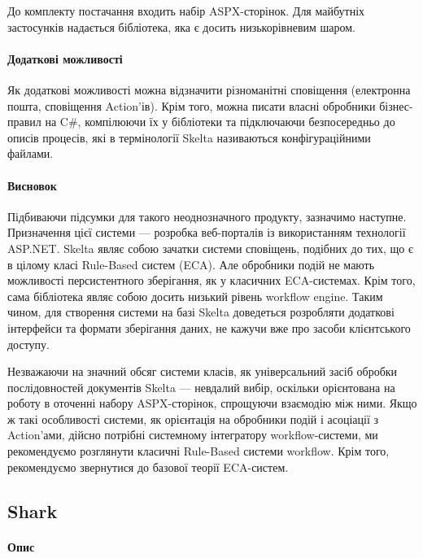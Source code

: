 \documentclass{memoir}
\begin{document}
До комплекту постачання входить набір ASPX-сторінок. Для майбутніх застосунків надається бібліотека, яка є досить низькорівневим шаром.

\paragraph{Додаткові можливості}

Як додаткові можливості можна відзначити різноманітні сповіщення (електронна пошта, сповіщення Action’ів). Крім того, можна писати власні обробники бізнес-правил на C\#, компілюючи їх у бібліотеки та підключаючи безпосередньо до описів процесів, які в термінології Skelta називаються конфігураційними файлами.

\paragraph{Висновок}

Підбиваючи підсумки для такого неоднозначного продукту, зазначимо наступне. Призначення цієї системи — розробка веб-порталів із використанням технології ASP.NET. Skelta являє собою зачатки системи сповіщень, подібних до тих, що є в цілому класі Rule-Based систем (ECA). Але обробники подій не мають можливості персистентного зберігання, як у класичних ECA-системах. Крім того, сама бібліотека являє собою досить низький рівень workflow engine. Таким чином, для створення системи на базі Skelta доведеться розробляти додаткові інтерфейси та формати зберігання даних, не кажучи вже про засоби клієнтського доступу.

Незважаючи на значний обсяг системи класів, як універсальний засіб обробки послідовностей документів Skelta — невдалий вибір, оскільки орієнтована на роботу в оточенні набору ASPX-сторінок, спрощуючи взаємодію між ними. Якщо ж такі особливості системи, як орієнтація на обробники подій і асоціації з Action’ами, дійсно потрібні системному інтегратору workflow-системи, ми рекомендуємо розглянути класичні Rule-Based системи workflow. Крім того, рекомендуємо звернутися до базової теорії ECA-систем.

\subsection{Shark}

\paragraph{Опис}
\end{document}

